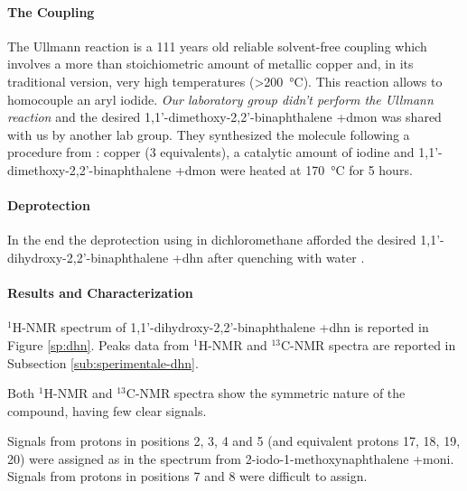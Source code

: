   \paragraph{The Coupling}
    The Ullmann reaction is a 111 years old reliable solvent-free coupling which involves a more than stoichiometric amount of metallic copper and, in its traditional version, very high temperatures (\textgreater\SI{200}{\celsius}). This reaction allows to homo\-couple an aryl iodide. 
    \emph{Our laboratory group didn't perform the Ullmann reaction} and the desired 1,1'-dimethoxy-2,2'-bi\-naphthalene \cmpd+{dmon} was shared with us by another lab group. They synthesized the molecule following a procedure from \citet{JR9310001265}: copper (3 equivalents), a catalytic amount of iodine and 1,1'-dimethoxy-2,2'-bi\-naphthalene \cmpd+{dmon} were heated at \SI{170}{\celsius} for 5 hours.%

  \paragraph{De\-protection}
    In the end the deprotection using  in di\-chloro\-methane afforded the desired 1,1'-di\-hydroxy-2,2'-bi\-naphthalene \cmpd+{dhn} after quenching with water \cite{McOmie1968}.

  \paragraph{Results and Characterization}
    $^{1}$H-NMR spectrum of 1,1’-di\-hydroxy-2,2’-bi\-naphthalene \cmpd+{dhn} is reported in Figure \ref{sp:dhn}.
    Peaks data from $^{1}$H-NMR and $^{13}$C-NMR spectra are reported in Subsection \ref{sub:sperimentale-dhn}.
    
    Both $^{1}$H-NMR and $^{13}$C-NMR spectra show the symmetric nature of the compound, having few clear signals.
    
    Signals from protons in positions 2, 3, 4 and 5 (and equivalent protons 17, 18, 19, 20) were assigned as in the spectrum from 2-iodo-1-methoxy\-naphthalene \cmpd+{moni}. %
    Signals from protons in positions 7 and 8 were difficult to assign. 


